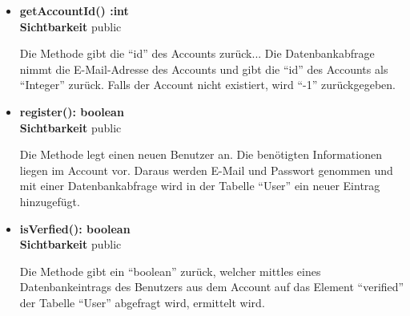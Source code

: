 \begin{itemize}
\item \textbf{getAccountId() :int}\hfill\\
\textbf{Sichtbarkeit} public

Die Methode gibt die ``id'' des Accounts zurück... Die Datenbankabfrage nimmt die E-Mail-Adresse des Accounts und gibt die ``id'' des Accounts als ``Integer'' zurück. Falls der Account nicht existiert, wird ``-1'' zurückgegeben.

\item \textbf{register(): boolean}\hfill\\
\textbf{Sichtbarkeit} public

Die Methode legt einen neuen Benutzer an. Die benötigten Informationen liegen im Account vor. Daraus werden E-Mail und Passwort genommen und mit einer Datenbankabfrage wird in der Tabelle ``User'' ein neuer Eintrag hinzugefügt. 

\item \textbf{isVerfied(): boolean}\hfill\\
\textbf{Sichtbarkeit} public

Die Methode gibt ein ``boolean'' zurück, welcher mittles eines Datenbankeintrags des Benutzers aus dem Account auf das Element ``verified'' der Tabelle ``User'' abgefragt wird, ermittelt wird.

\end{itemize}